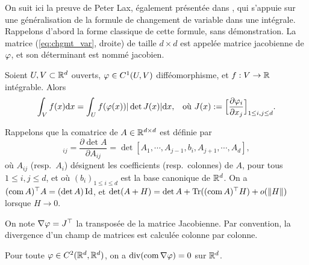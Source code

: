 On suit ici la preuve de Peter Lax, également présentée dans \cite{alazard2017analyse}, qui s'appuie sur une généralisation de la formule de changement de variable dans une intégrale. 
Rappelons d'abord la forme classique de cette formule, sans démonstration. La matrice (\ref{eq:chgmt_var}, droite) de taille $d \times d$ est appelée matrice jacobienne de $\varphi$, et son déterminant est nommé jacobien. 
\begin{theorem}
\label{th:chgVarIntegr}
%
Soient $U,V \subset \mathbb{R}^d$ ouverts, $\varphi \in C^1(U, V)$ difféomorphisme, et $f : V \to \mathbb{R}$ intégrable. 
Alors %
\begin{align}
\label{eq:chgmt_var}	
	\int_V f(x) \mathrm{d} x &= \int_U f(\varphi(x)) |\det J(x)| \mathrm{d} x,&
	\text{où }
	J(x) := \Big[ \frac{\partial \varphi_i}{\partial x_j}\Big]_{1 \leq i,j \leq d}.
\end{align}	
\end{theorem}

Rappelons que la comatrice de $A \in \mathbb{R}^{d\times d}$  est définie par
\begin{equation*}
	[\com A]_{ij} = \frac{\partial \det A}{\partial A_{ij}} = \det [A_1,\cdots,A_{j-1}, b_i, A_{j+1},\cdots, A_d],
\end{equation*}
où $A_{ij}$ (resp.\ $A_i$) désignent les coefficients (resp.\ colonnes) de $A$, pour tous $1 \leq i, j \leq d$, et où $(b_i)_{1 \leq i \leq d}$ est la base canonique de $\mathbb{R}^d$. On a $(\operatorname{com} A)^\top A = (\det A) \operatorname{Id}$, et $\det (A+H) = \det A + \operatorname{Tr}((\operatorname{com} A)^\top H) + o(\|H\|)$ lorsque $H \to 0$. 

On note $\nabla \varphi = J^\top$ la transposée de la matrice Jacobienne.
Par convention, la divergence d'un champ de matrices est calculée colonne par colonne.

\begin{lemma} \label{lem:Piola}
%
Pour toute $\varphi \in C^2(\mathbb{R}^d,\mathbb{R}^d)$, on a $\operatorname{div}( \operatorname{com} \nabla \varphi) = 0$ sur $\mathbb{R}^d$.
\end{lemma}

